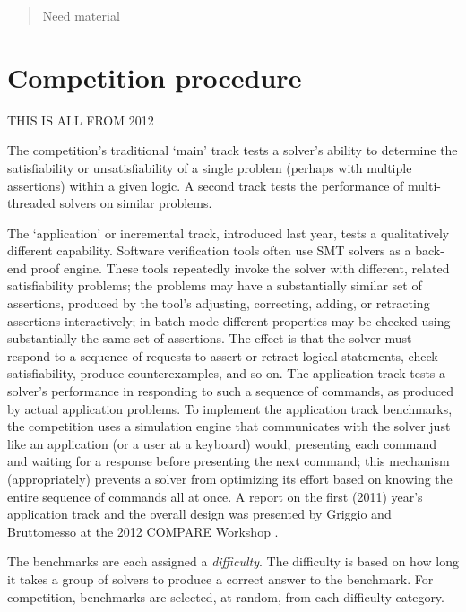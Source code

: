 \documentclass[twosize,11pt]{article}
\newcommand{\tjark}[1]{\begin{quote}\sc #1\marginpar{\textcolor{red}{$\ast^{\mbox{TW}}$}}\end{quote}}
\newcommand{\tjarkx}[1]{\tjark{#1}}
\begin{document}
\tjarkx{Need material}

\section{Competition procedure} 
\label{sec:procedure}

THIS IS ALL FROM 2012

The competition's traditional `main' track tests a solver's ability to determine the satisfiability or unsatisfiability of a single problem (perhaps with multiple assertions) within a given logic. A second track tests the performance of multi-threaded solvers on similar problems.

The `application' or incremental track, introduced last year, tests a qualitatively different capability. Software verification tools often use SMT solvers as a back-end proof engine. These tools repeatedly invoke the solver with different, related satisfiability problems; the problems may have a substantially similar set of assertions, produced by the tool's adjusting, correcting, adding, or retracting assertions interactively; in batch mode different properties may be checked using substantially the same set of assertions.
The effect is that the solver must respond to a sequence of requests to assert or retract logical statements, check satisfiability, produce counterexamples, and so on. The application track tests a solver's performance in responding to such a sequence of commands, as produced by actual application problems. To implement the application track benchmarks, the 
competition uses a simulation engine that communicates with the solver just like an application (or a user at a keyboard) would, presenting each command and waiting for a response before presenting the next command; this mechanism (appropriately) prevents a solver from optimizing its effort based on knowing the entire sequence of commands all at once. A report
on the first (2011) year's application track and the overall design was presented by Griggio and Bruttomesso at the 
2012 COMPARE Workshop \cite{ag+rb+12}.

The benchmarks are each assigned a {\em difficulty}. The difficulty is based on how long it takes a group of solvers to produce a correct answer to the benchmark. For competition, benchmarks are selected, at random, from each difficulty category. 
\end{document}
